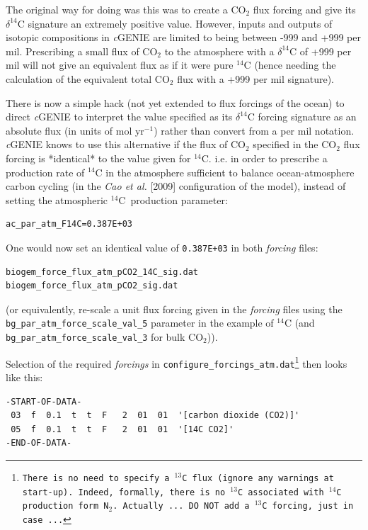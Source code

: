 \documentclass[11pt,fleqn]{book} %
\begin{document}
The original way for doing was this was to create a CO\(_{2}\) flux forcing and give its \(\delta^{14}\)C signature an extremely positive value. However, inputs and outputs of isotopic compositions in \textit{c}GENIE are limited to being between -999 and +999 per mil. Prescribing a small flux of CO\(_{2}\) to the atmosphere with a \(\delta^{14}\)C of +999 per mil will not give an equivalent flux as if it were pure \(^{14}\)C (hence needing the calculation of the equivalent total CO\(_{2}\) flux with a +999 per mil signature).

There is now a simple hack (not yet extended to flux forcings of the ocean) to direct \textit{c}GENIE to interpret the value specified as its \(\delta^{14}\)C forcing signature as an absolute flux (in units of mol yr\(^{-1}\)) rather than convert from a per mil notation. \textit{c}GENIE knows to use this alternative if the flux of CO\(_{2}\) specified in the CO\(_{2}\) flux forcing is *identical* to the value given for \(^{14}\)C. i.e. in order to prescribe a production rate of \(^{14}\)C in the atmosphere sufficient to balance ocean-atmosphere carbon cycling (in the \textit{Cao et al.} [2009] configuration of the model), instead of setting the atmospheric \(^{14}\)C\ production parameter:
\vspace{-2mm}\small\begin{verbatim}
ac_par_atm_F14C=0.387E+03 
\end{verbatim}\normalsize\vspace{-2mm}

\noindent One would now set an identical value of \texttt{0.387E+03} in both \textit{forcing} files:
\vspace{-2mm}\small\begin{verbatim}
biogem_force_flux_atm_pCO2_14C_sig.dat
biogem_force_flux_atm_pCO2_sig.dat
\end{verbatim}\normalsize\vspace{-2mm}
(or equivalently, re-scale a unit flux forcing given in the \textit{forcing} files using the \texttt{bg\_par\_atm\_force\_scale\_val\_5} parameter in the example of \(^{14}\)C (and \texttt{bg\_par\_atm\_force\_scale\_val\_3} for bulk CO\(_{2}\))).

\noindent Selection of the required \textit{forcings} in \texttt{configure\_forcings\_atm.dat\footnote{There is no need to specify a \(^{13}\)C flux (ignore any warnings at start-up). Indeed, formally, there is no \(^{13}\)C associated with \(^{14}\)C production form N\(_{2}\). Actually ... DO NOT add a \(^{13}\)C forcing, just in case ...}} then looks like this: 
\vspace{-2mm}\small\begin{verbatim}
-START-OF-DATA-
 03  f  0.1  t  t  F   2  01  01  '[carbon dioxide (CO2)]'
 05  f  0.1  t  t  F   2  01  01  '[14C CO2]'
-END-OF-DATA-
\end{verbatim}\normalsize\vspace{-2mm}
\end{document}
